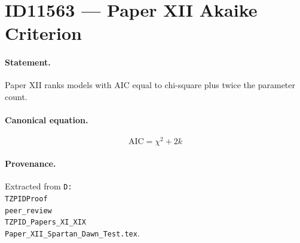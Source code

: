 \section*{ID11563 --- Paper XII Akaike Criterion}

\paragraph{Statement.}
Paper XII ranks models with AIC equal to chi-square plus twice the parameter count.

\paragraph{Canonical equation.}
\[
\mathrm{AIC}=\chi^2+2k
\]

\paragraph{Provenance.}
Extracted from \texttt{D:\\TZPIDProof\\peer\_review\\TZPID\_Papers\_XI\_XIX\\Paper\_XII\_Spartan\_Dawn\_Test.tex}.
